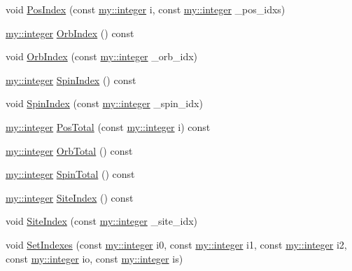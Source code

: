 \begin{DoxyCompactItemize}
\item 
void \hyperlink{classLatticeIndex_a887aa5c4c61175bf743240db0da4c9e3}{Pos\+Index} (const \hyperlink{namespacemy_a42365393c537edae1e89d20ff90d1923}{my\+::integer} i, const \hyperlink{namespacemy_a42365393c537edae1e89d20ff90d1923}{my\+::integer} \+\_\+pos\+\_\+idxs)
\item 
\hyperlink{namespacemy_a42365393c537edae1e89d20ff90d1923}{my\+::integer} \hyperlink{classLatticeIndex_a751bf4b5bbabd88c2874e8e2f2037a56}{Orb\+Index} () const 
\item 
void \hyperlink{classLatticeIndex_a56d4aa1d134d4b6b3842dfffbfa4324c}{Orb\+Index} (const \hyperlink{namespacemy_a42365393c537edae1e89d20ff90d1923}{my\+::integer} \+\_\+orb\+\_\+idx)
\item 
\hyperlink{namespacemy_a42365393c537edae1e89d20ff90d1923}{my\+::integer} \hyperlink{classLatticeIndex_a901bd6d22531e174def0c60ca7872635}{Spin\+Index} () const 
\item 
void \hyperlink{classLatticeIndex_af933128de8224df8695d4a6c62724be2}{Spin\+Index} (const \hyperlink{namespacemy_a42365393c537edae1e89d20ff90d1923}{my\+::integer} \+\_\+spin\+\_\+idx)
\item 
\hyperlink{namespacemy_a42365393c537edae1e89d20ff90d1923}{my\+::integer} \hyperlink{classLatticeIndex_affd4c13b4cde72e97de5afc5712f98bd}{Pos\+Total} (const \hyperlink{namespacemy_a42365393c537edae1e89d20ff90d1923}{my\+::integer} i) const 
\item 
\hyperlink{namespacemy_a42365393c537edae1e89d20ff90d1923}{my\+::integer} \hyperlink{classLatticeIndex_a378331767d7d5bbaa722654295f4847d}{Orb\+Total} () const 
\item 
\hyperlink{namespacemy_a42365393c537edae1e89d20ff90d1923}{my\+::integer} \hyperlink{classLatticeIndex_a404f39a5c99bbb1678c318f7f8e559e4}{Spin\+Total} () const 
\item 
\hyperlink{namespacemy_a42365393c537edae1e89d20ff90d1923}{my\+::integer} \hyperlink{classLatticeIndex_ad6af8f4ab08911a112c76d13d0bad16c}{Site\+Index} () const 
\item 
void \hyperlink{classLatticeIndex_a26f432e99332f850f9bc8ea6d41d6f21}{Site\+Index} (const \hyperlink{namespacemy_a42365393c537edae1e89d20ff90d1923}{my\+::integer} \+\_\+site\+\_\+idx)
\item 
void \hyperlink{classLatticeIndex_ae36cd0290d2211fbf1b3841a7718e3ab}{Set\+Indexes} (const \hyperlink{namespacemy_a42365393c537edae1e89d20ff90d1923}{my\+::integer} i0, const \hyperlink{namespacemy_a42365393c537edae1e89d20ff90d1923}{my\+::integer} i1, const \hyperlink{namespacemy_a42365393c537edae1e89d20ff90d1923}{my\+::integer} i2, const \hyperlink{namespacemy_a42365393c537edae1e89d20ff90d1923}{my\+::integer} io, const \hyperlink{namespacemy_a42365393c537edae1e89d20ff90d1923}{my\+::integer} is)
\end{DoxyCompactItemize}
